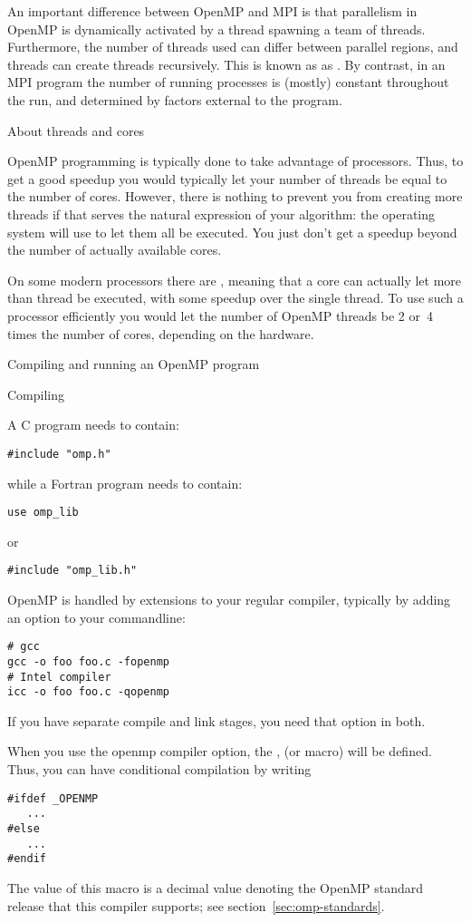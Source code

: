 An important difference between OpenMP and MPI is that parallelism in
OpenMP is dynamically activated by a thread spawning a team of
threads. Furthermore,
the number of threads used can differ between parallel regions, and
threads can create threads recursively. This is known as
as . By contrast, in an MPI program the number
of running processes is (mostly) constant throughout the run, and
determined by factors external to the program.

 {About threads and cores}

OpenMP programming is typically done to take advantage of
 processors. Thus, to get a good speedup you
would typically let your number of threads be equal to the number of
cores. However, there is nothing to prevent you from creating more
threads if that serves the natural expression of your algorithm:
the operating system will use  to let
them all be executed. You just don't get a speedup beyond the number
of actually available cores.

On some modern processors there are ,
meaning that a core can actually let more than thread be executed,
with some speedup over the single thread. To use such a processor
efficiently you would let the number of OpenMP threads be
2 or~4 times the number of cores, depending on the hardware.

 {Compiling and running an OpenMP program}

 {Compiling}

A C program needs to contain:
\begin{lstlisting}
#include "omp.h"
\end{lstlisting}
while a Fortran program needs to contain:
\begin{lstlisting}
use omp_lib
\end{lstlisting}
or
\begin{lstlisting}
#include "omp_lib.h"
\end{lstlisting}

OpenMP is handled by extensions to your regular compiler, typically by
adding an option to your commandline:
\begin{verbatim}
# gcc
gcc -o foo foo.c -fopenmp
# Intel compiler
icc -o foo foo.c -qopenmp
\end{verbatim}
If you have separate compile and link stages, you need that option in both.

When you use the openmp compiler option, 
the ,
(or   macro)
will be defined. Thus, you can have conditional compilation by writing
\begin{lstlisting}
#ifdef _OPENMP
   ...
#else
   ...
#endif
\end{lstlisting}
The value of this macro is a decimal value  denoting the OpenMP standard release
that this compiler supports;
see section~\ref{sec:omp-standards}.

